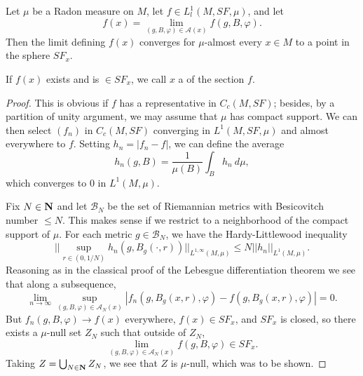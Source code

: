 \begin{proposition}\label{LebDiff}
Let $\mu$ be a Radon measure on $M$, let $f \in L^1_l(M, SF, \mu)$, and let
$$f(x) = \lim_{(g, B, \varphi) \in \mathcal A(x)} f(g, B, \varphi).$$
Then the limit defining $f(x)$ converges for $\mu$-almost every $x \in M$ to a point in the sphere $SF_x$.
\end{proposition}
If $f(x)$ exists and is $\in SF_x$, we call $x$ a  of the section $f$.
\begin{proof}
This is obvious if $f$ has a representative in $C_c(M, SF)$; besides, by a partition of unity argument, we may assume that $\mu$ has compact support.
We can then select $(f_n)$ in $C_c(M, SF)$ converging in $L^1(M, SF, \mu)$ and almost everywhere to $f$.
Setting $h_n = |f_n - f|$, we can define the average
$$h_n(g, B) = \frac{1}{\mu(B)} \int_B h_n ~d\mu,$$
which converges to $0$ in $L^1(M, \mu)$.

Fix $N \in \mathbf{N}$ and let $\mathcal B_N$ be the set of Riemannian metrics with Besicovitch number $\leq N$.
This makes sense if we restrict to a neighborhood of the compact support of $\mu$.
For each metric $g \in \mathcal B_N$, we have the Hardy-Littlewood inequality \cite[Lemma 4.1.1a]{Ledrappier85}
\begin{equation}\label{HardyLittlewood}
||\sup_{r \in (0, 1/N)} h_n(g, B_g(\cdot, r))||_{L^{1, \infty}(M, \mu)} \leq N ||h_n||_{L^1(M, \mu)}.
\end{equation}
Reasoning as in the classical proof of the Lebesgue differentiation theorem we see that along a subsequence,
$$\lim_{n \to \infty} \sup_{(g, B, \varphi) \in \mathcal A_N(x)} |f_n(g, B_g(x, r), \varphi) - f(g, B_g(x, r), \varphi)| = 0.$$
But $f_n(g, B, \varphi) \to f(x)$ everywhere, $f(x) \in SF_x$, and $SF_x$ is closed, so there exists a $\mu$-null set $Z_N$ such that outside of $Z_N$,
$$\lim_{(g, B, \varphi) \in \mathcal A_N(x)} f(g, B, \varphi) \in SF_x.$$
Taking $Z = \bigcup_{N \in \mathbf{N}} Z_N$, we see that $Z$ is $\mu$-null, which was to be shown.
\end{proof}

